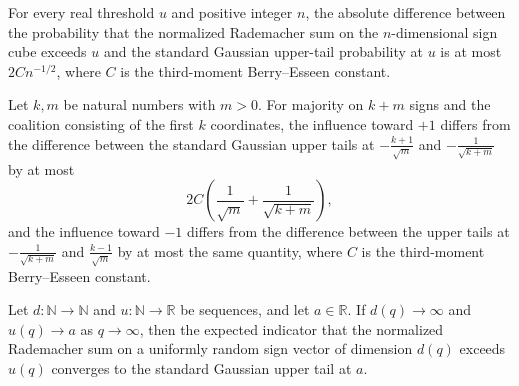 \begin{theorem}
\label{FABL.abs_expect_hammingUpperTailIndicator_dimension_le}
\leanok
{}
For every real threshold $u$ and positive integer $n$, the absolute difference between
the probability that the normalized Rademacher sum on the $n$-dimensional sign cube
exceeds $u$ and the standard Gaussian upper-tail probability at $u$ is at most $2C
n^{-1/2}$, where $C$ is the third-moment Berry–Esseen constant.
\end{theorem}

\begin{theorem}
\label{FABL.majority_head_directed_influence_finite_error}
\leanok
{}
Let $k,m$ be natural numbers with $m>0$. For majority on $k+m$ signs and the coalition
consisting of the first $k$ coordinates, the influence toward $+1$ differs from the
difference between the standard Gaussian upper tails at $-\frac{k+1}{\sqrt m}$ and
$-\frac{1}{\sqrt{k+m}}$ by at most
\[
2C\left(\frac{1}{\sqrt m}+\frac{1}{\sqrt{k+m}}\right),
\]
and the influence toward $-1$ differs from the difference between the upper tails at
$-\frac{1}{\sqrt{k+m}}$ and $\frac{k-1}{\sqrt m}$ by at most the same quantity, where
$C$ is the third-moment Berry–Esseen constant.
\end{theorem}

\begin{theorem}
\label{FABL.tendsto_expect_hammingUpperTailIndicator_of_tendsto}
\leanok
{}
Let $d:\mathbb N\to\mathbb N$ and $u:\mathbb N\to\mathbb R$ be sequences, and let
$a\in\mathbb R$. If $d(q)\to\infty$ and $u(q)\to a$ as $q\to\infty$, then the expected
indicator that the normalized Rademacher sum on a uniformly random sign vector of
dimension $d(q)$ exceeds $u(q)$ converges to the standard Gaussian upper tail at $a$.
\end{theorem}

